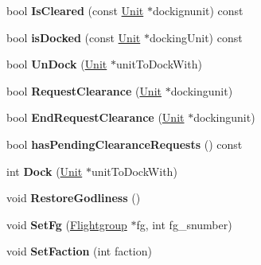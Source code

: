 \begin{DoxyCompactItemize}
\item 
bool {\bfseries Is\+Cleared} (const \hyperlink{classUnit}{Unit} $\ast$dockignunit) const \hypertarget{classUnit_af32eeb4ef4aa7790b3aa0b34cee9a6fb}{}\label{classUnit_af32eeb4ef4aa7790b3aa0b34cee9a6fb}

\item 
bool {\bfseries is\+Docked} (const \hyperlink{classUnit}{Unit} $\ast$docking\+Unit) const \hypertarget{classUnit_a62d7951f0e5acdd8ba85269a211c893f}{}\label{classUnit_a62d7951f0e5acdd8ba85269a211c893f}

\item 
bool {\bfseries Un\+Dock} (\hyperlink{classUnit}{Unit} $\ast$unit\+To\+Dock\+With)\hypertarget{classUnit_aec177e1eec43a5a2db18ef1bee6eaf3d}{}\label{classUnit_aec177e1eec43a5a2db18ef1bee6eaf3d}

\item 
bool {\bfseries Request\+Clearance} (\hyperlink{classUnit}{Unit} $\ast$dockingunit)\hypertarget{classUnit_a5e03d4fb4c1b321e746a7508c01d3037}{}\label{classUnit_a5e03d4fb4c1b321e746a7508c01d3037}

\item 
bool {\bfseries End\+Request\+Clearance} (\hyperlink{classUnit}{Unit} $\ast$dockingunit)\hypertarget{classUnit_a99aae69b8891c4079005805f68564b3d}{}\label{classUnit_a99aae69b8891c4079005805f68564b3d}

\item 
bool {\bfseries has\+Pending\+Clearance\+Requests} () const \hypertarget{classUnit_a22eff865a95533ab9e3d2b5d6e03c241}{}\label{classUnit_a22eff865a95533ab9e3d2b5d6e03c241}

\item 
int {\bfseries Dock} (\hyperlink{classUnit}{Unit} $\ast$unit\+To\+Dock\+With)\hypertarget{classUnit_aa84b73e74f2443418307fb7d6c011ec5}{}\label{classUnit_aa84b73e74f2443418307fb7d6c011ec5}

\item 
void {\bfseries Restore\+Godliness} ()\hypertarget{classUnit_a1c7e0464dc64302378ad6cdcac19adfa}{}\label{classUnit_a1c7e0464dc64302378ad6cdcac19adfa}

\item 
void {\bfseries Set\+Fg} (\hyperlink{classFlightgroup}{Flightgroup} $\ast$fg, int fg\+\_\+snumber)\hypertarget{classUnit_a0902e78b0eff79d527c4e205e602b145}{}\label{classUnit_a0902e78b0eff79d527c4e205e602b145}

\item 
void {\bfseries Set\+Faction} (int faction)\hypertarget{classUnit_a4faabee1bf47541d0cb1b984ff9a2251}{}\label{classUnit_a4faabee1bf47541d0cb1b984ff9a2251}


\end{DoxyCompactItemize}
